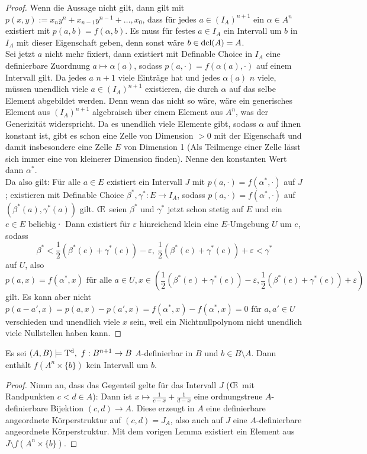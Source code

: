 \begin{proof}
	Wenn die Aussage nicht gilt, dann gilt mit $p(x,y):=x_ny^n+x_{n-1}y^{n-1}+\dots,x_0$, dass für jedes $a\in (I_A)^{n+1}$ ein $\alpha\in A^n$ existiert mit $p(a,b)=f(\alpha,b)$. Es muss für festes $a\in I_A$ ein Intervall um $b$ in $I_A$ mit dieser Eigenschaft geben, denn sonst wäre $b\in\operatorname{dcl}(A)=A$.\\
	Sei jetzt $a$ nicht mehr fixiert, dann existiert mit Definable Choice in $I_A$ eine definierbare Zuordnung $a\mapsto\alpha(a)$, sodass $p(a,\cdot)=f(\alpha(a),\cdot)$ auf einem Intervall gilt. Da jedes $a$ $n+1$ viele Einträge hat und jedes $\alpha(a)$ $n$ viele, müssen unendlich viele $a\in (I_A)^{n+1}$ existieren, die durch $\alpha$ auf das selbe Element abgebildet werden. Denn wenn das nicht so wäre, wäre ein generisches Element aus $(I_A)^{n+1}$ algebraisch über einem Element aus $A^n$, was der Generizität widerspricht. Da es unendlich viele Elemente gibt, sodass $\alpha$ auf ihnen konstant ist, gibt es schon eine Zelle von Dimension $>0$ mit der Eigenschaft und damit insbesondere eine Zelle $E$ von Dimension 1 (Als Teilmenge einer Zelle lässt sich immer eine von kleinerer Dimension finden). Nenne den konstanten Wert dann $\alpha^*$.\\
	Da also gilt: Für alle $a\in E$ existiert ein Intervall $J$ mit $p(a,\cdot)=f(\alpha^*,\cdot)$ auf $J$; existieren mit Definable Choice $\beta^*,\gamma^*:E\rightarrow I_A$, sodass $p(a,\cdot)=f(\alpha^*,\cdot)$ auf $(\beta^*(a),\gamma^*(a))$ gilt. \OE\ seien $\beta^*$ und $\gamma^*$ jetzt schon stetig auf $E$ und ein $e\in E$ beliebig· Dann existiert für $\varepsilon$ hinreichend klein eine $E$-Umgebung $U$ um $e$, sodass $$\beta^*<\frac{1}{2}(\beta^*(e)+\gamma^*(e))-\varepsilon,\ \frac{1}{2}(\beta^*(e)+\gamma^*(e))+\varepsilon<\gamma^*$$ auf $U$, also $$p(a,x)=f(\alpha^*,x)\text{ für alle }a\in U,x\in(\frac{1}{2}(\beta^*(e)+\gamma^*(e))-\varepsilon,\frac{1}{2}(\beta^*(e)+\gamma^*(e))+\varepsilon)$$ gilt. Es kann aber nicht $p(a-a',x)=p(a,x)-p(a',x)=f(\alpha^*,x)-f(\alpha^*,x)=0$ für $a,a'\in U$ verschieden und unendlich viele $x$ sein, weil ein Nichtnullpolynom nicht unendlich viele Nullstellen haben kann.
\end{proof}

\newpage

\begin{corollary}
	Es sei $(A,B)\models\td,\ f:B^{n+1}\rightarrow B$ $A$-definierbar in $B$ und $b\in B\setminus A$. Dann enthält $f(A^n\times\{b\})$ kein Intervall um $b$.
\end{corollary}
\begin{proof}
	Nimm an, dass das Gegenteil gelte für das Intervall $J$ (\OE\ mit Randpunkten $c<d\in A$): Dann ist $x\mapsto\frac{1}{c-x}+\frac{1}{d-x}$ eine ordnungstreue $A$-definierbare Bijektion $(c,d)\rightarrow A$. Diese erzeugt in $A$ eine definierbare angeordnete Körperstruktur auf $(c,d)=J_A$, also auch auf $J$ eine $A$-definierbare angeordnete Körperstruktur. Mit dem vorigen Lemma existiert ein Element aus $J\setminus f(A^n\times\{b\})$.
\end{proof}

